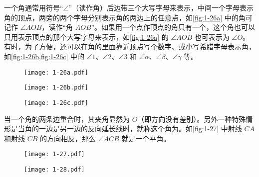 一个角通常用符号“$\angle$”（读作角）后边带三个大写字母来表示，中间一个字母表示角的顶点，两旁的两个字母分别表示角的两边上的任意点，如\cref{fig:1-26a} 中的角可记作 $\angle AOB$，读作“角 $AOB$”。如果用一个点作顶点的角只有一个，这个角也可以只用表示顶点的那个大写字母来表示，如\cref{fig:1-26a}  的 $\angle AOB$ 也可表示为 $\angle O$。有时，为了方便，还可以在角的里面靠近顶点写个数字、或小写希腊字母表示角，如\cref{fig:1-26b,fig:1-26c} 中的 $\angle 1$、$\angle 2$、$\angle 3$ 和 $\angle \alpha$、$\angle \beta$、$\angle \gamma$ 等。

\begin{figure}
	\begin{minipage}[b]{0.32\linewidth}\centering
		\texttt{[image: 1-26a.pdf]}
		\subcaption{}\label{fig:1-26a}
	\end{minipage}%
	\begin{minipage}[b]{0.32\linewidth}\centering
		\texttt{[image: 1-26b.pdf]}
		\subcaption{}\label{fig:1-26b}
	\end{minipage}%
	\begin{minipage}[b]{0.32\linewidth}\centering
		\texttt{[image: 1-26c.pdf]}
		\subcaption{}\label{fig:1-26c}
	\end{minipage}
	\caption{}\label{fig:1-26}
\end{figure}

当一个角的两条边重合时，其夹角显然为 $O$（即方向没有差别）。另外一种特殊情形是当角的一边是另一边的反向延长线时，就称这个角为。如\cref{fig:1-27} 中射线 $CA$ 和射线 $CB$ 的方向相反，那么 $\angle ACB$ 就是一个平角。

\begin{figure}
  \begin{minipage}[b]{0.48\linewidth}
    \centering
		\texttt{[image: 1-27.pdf]}
    \caption{}\label{fig:1-27}
	\end{minipage}
	\begin{minipage}[b]{0.48\linewidth}
    \centering
    \texttt{[image: 1-28.pdf]}
    \caption{}\label{fig:1-28}
	\end{minipage}
\end{figure}


